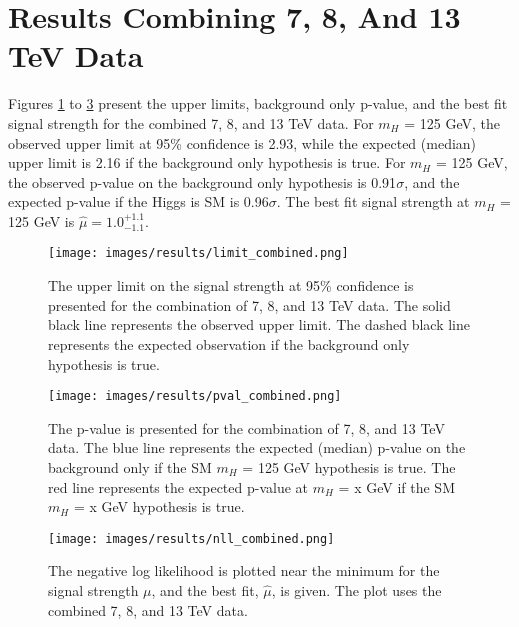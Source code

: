 \section{Results Combining 7, 8, And 13 TeV Data}
Figures \ref{fig:limit7813} to \ref{fig:signalstrength7813} present the upper limits, background only p-value, and the best fit signal strength for the combined 7, 8, and 13 TeV data. For $m_H$ = 125 GeV, the observed upper limit at 95\% confidence is 2.93, while the expected (median) upper limit is 2.16 if the background only hypothesis is true. For $m_H$ = 125 GeV, the observed p-value on the background only hypothesis is 0.91$\sigma$, and the expected p-value if the Higgs is SM is 0.96$\sigma$. The best fit signal strength at $m_H$ = 125 GeV is $\hat{\mu} = 1.0^{+1.1}_{-1.1}$. 
\begin{figure}[h!]
    \centering
    \texttt{[image: images/results/limit\_combined.png]}
    \caption[The upper limit on the signal strength combining 7, 8, and 13 TeV data.]
    {The upper limit on the signal strength at 95\% confidence is presented for the combination of 7, 8, and 13 TeV data. The solid black line represents the observed upper limit. The dashed black line represents the expected observation if the background only hypothesis is true.}
    \label{fig:limit7813}
\end{figure}
\begin{figure}[h!]
    \centering
    \texttt{[image: images/results/pval\_combined.png]}
    \caption[The p-value on the background only hypothesis combining 7, 8, and 13 TeV data.]
    {The p-value is presented for the combination of 7, 8, and 13 TeV data. The blue line represents the expected (median) p-value on the background only if the SM $m_H$ = 125 GeV hypothesis is true. The red line represents the expected p-value at $m_H$ = x GeV if the SM $m_H$ = x GeV hypothesis is true.}
    \label{fig:pval7813}
\end{figure}
\begin{figure}[h!]
    \centering
    \texttt{[image: images/results/nll\_combined.png]}
    \caption[The negative log likelihood for the combined 7, 8, and 13 TeV data.]
    {The negative log likelihood is plotted near the minimum for the signal strength $\mu$, and the best fit, $\hat{\mu}$, is given. The plot uses the combined 7, 8, and 13 TeV data.}
    \label{fig:signalstrength7813}
\end{figure}
